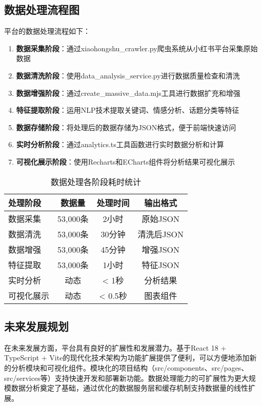 \documentclass[12pt,a4paper]{article}
\begin{document}
\subsection{数据处理流程图}

平台的数据处理流程如下：

\begin{enumerate}
    \item \textbf{数据采集阶段}：通过xiaohongshu\_crawler.py爬虫系统从小红书平台采集原始数据
    \item \textbf{数据清洗阶段}：使用data\_analysis\_service.py进行数据质量检查和清洗
    \item \textbf{数据增强阶段}：通过create\_massive\_data.mjs工具进行数据扩充和增强
    \item \textbf{特征提取阶段}：运用NLP技术提取关键词、情感分析、话题分类等特征
    \item \textbf{数据存储阶段}：将处理后的数据存储为JSON格式，便于前端快速访问
    \item \textbf{实时分析阶段}：通过analytics.ts工具函数进行实时数据分析和计算
    \item \textbf{可视化展示阶段}：使用Recharts和ECharts组件将分析结果可视化展示
\end{enumerate}

\begin{table}[H]
\centering
\caption{数据处理各阶段耗时统计}
\begin{tabular}{|l|c|c|c|}
\hline
\textbf{处理阶段} & \textbf{数据量} & \textbf{处理时间} & \textbf{输出格式} \\
\hline
数据采集 & 53,000条 & 2小时 & 原始JSON \\
\hline
数据清洗 & 53,000条 & 30分钟 & 清洗后JSON \\
\hline
数据增强 & 53,000条 & 45分钟 & 增强JSON \\
\hline
特征提取 & 53,000条 & 1小时 & 特征JSON \\
\hline
实时分析 & 动态 & < 1秒 & 分析结果 \\
\hline
可视化展示 & 动态 & < 0.5秒 & 图表组件 \\
\hline
\end{tabular}
\end{table}

\subsection{未来发展规划}

在未来发展方面，平台具有良好的扩展性和发展潜力。基于React 18 + TypeScript + Vite的现代化技术架构为功能扩展提供了便利，可以方便地添加新的分析模块和可视化组件。模块化的项目结构（src/components、src/pages、src/services等）支持快速开发和部署新功能。数据处理能力的可扩展性为更大规模数据分析奠定了基础，通过优化的数据服务层和缓存机制支持数据量的线性扩展。
\end{document}
